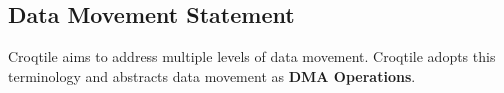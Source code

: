 \subsection*{Data Movement Statement}

Croqtile aims to address multiple levels of data movement. Croqtile adopts this terminology and abstracts data movement as \textbf{DMA Operations}.
